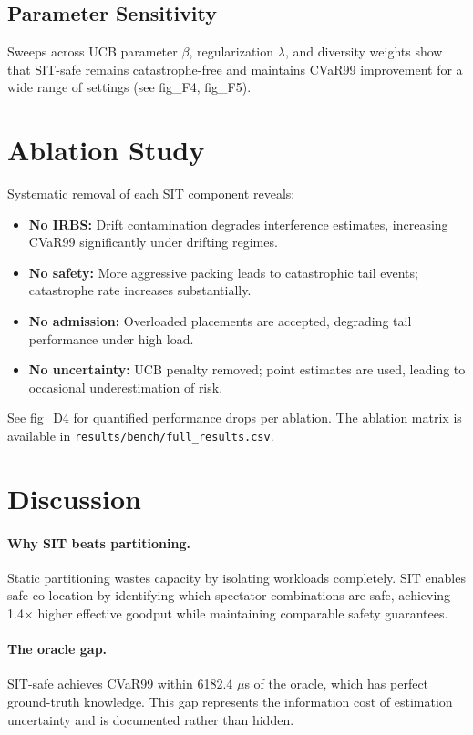 \documentclass[11pt,twocolumn]{article}
\begin{document}
\subsection{Parameter Sensitivity}

Sweeps across UCB parameter $\beta$, regularization $\lambda$,
and diversity weights show that SIT-safe remains catastrophe-free
and maintains CVaR99 improvement for a wide range of settings
(see fig\_F4, fig\_F5).

\section{Ablation Study}

Systematic removal of each SIT component reveals:

\begin{itemize}
\item \textbf{No IRBS:} Drift contamination degrades interference
estimates, increasing CVaR99 significantly under drifting regimes.
\item \textbf{No safety:} More aggressive packing leads to catastrophic
tail events; catastrophe rate increases substantially.
\item \textbf{No admission:} Overloaded placements are accepted,
degrading tail performance under high load.
\item \textbf{No uncertainty:} UCB penalty removed; point estimates
are used, leading to occasional underestimation of risk.
\end{itemize}

See fig\_D4 for quantified performance drops per ablation.
The ablation matrix is available in \texttt{results/bench/full\_results.csv}.

\section{Discussion}

\paragraph{Why SIT beats partitioning.}
Static partitioning wastes capacity by isolating workloads completely.
SIT enables safe co-location by identifying which spectator combinations
are safe, achieving 1.4$\times$ higher effective goodput while
maintaining comparable safety guarantees.

\paragraph{The oracle gap.}
SIT-safe achieves CVaR99 within 6182.4 $\mu$s of the oracle,
which has perfect ground-truth knowledge. This gap represents the
information cost of estimation uncertainty and is documented rather
than hidden.
\end{document}
